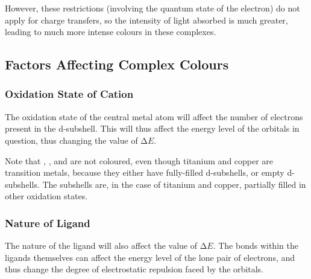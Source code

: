 			However, these restrictions (involving the quantum state of the electron) do not apply for charge transfers, so the intensity
			of light absorbed is much greater, leading to much more intense colours in these complexes.



		\subsection{Factors Affecting Complex Colours}

			\subsubsection{Oxidation State of Cation}

				The oxidation state of the central metal atom will affect the number of electrons present in the d-subshell. This will thus
				affect the energy level of the orbitals in question, thus changing the value of $∆E$.

				Note that , ,  and  are not coloured, even though titanium and copper are transition metals,
				because they either have fully-filled d-subshells, or empty d-subshells. The subshells are, in the case of titanium and copper,
				partially filled in other oxidation states.



			\subsubsection{Nature of Ligand}

				The nature of the ligand will also affect the value of $∆E$. The bonds within the ligands themselves can affect the energy
				level of the lone pair of electrons, and thus change the degree of electrostatic repulsion faced by the orbitals.


















